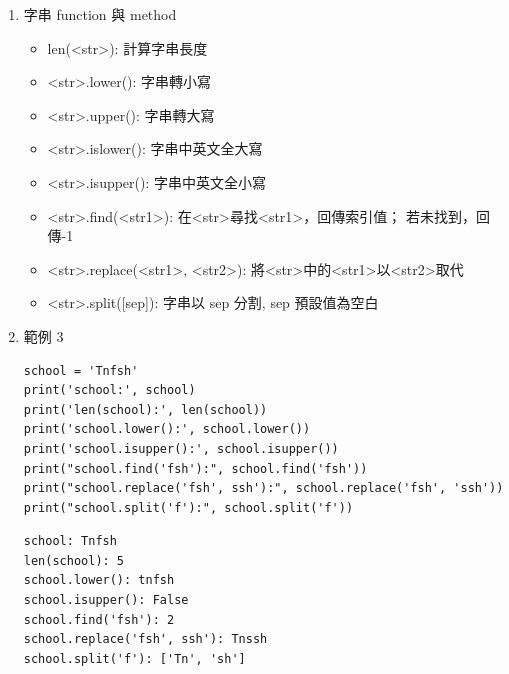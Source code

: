 \documentclass[a4paper,12pt]{article}
\begin{document}
\begin{enumerate}
\begin{verbatim}
tel+ext: 06-2371206#600
ext*2: #600#600
tel[5]: 7
tel[1:4]: 6-2
tel[6: ]: 1206
tel[ :6]: 06-237
tel[::-1]: 6021732-60
'9' in tel: False
\end{verbatim}
\item 字串 function 與 method
\label{sec:orgbfe671f}
\begin{itemize}
\item len(<str>):	計算字串長度\\
\item <str>.lower(): 字串轉小寫\\
\item <str>.upper(): 字串轉大寫\\
\item <str>.islower(): 字串中英文全大寫\\
\item <str>.isupper(): 字串中英文全小寫\\
\item <str>.find(<str1>): 在<str>尋找<str1>，回傳索引值； 若未找到，回傳-1\\
\item <str>.replace(<str1>, <str2>): 將<str>中的<str1>以<str2>取代\\
\item <str>.split([sep]): 字串以 sep 分割, sep 預設值為空白\\
\end{itemize}
\item 範例 3
\label{sec:org77d9b3d}
\lstset{breaklines=true,language=Python,label= ,caption= ,captionpos=b,firstnumber=1,numbers=left}
\begin{lstlisting}
school = 'Tnfsh'
print('school:', school)
print('len(school):', len(school))
print('school.lower():', school.lower())
print('school.isupper():', school.isupper())
print("school.find('fsh'):", school.find('fsh'))
print("school.replace('fsh', ssh'):", school.replace('fsh', 'ssh'))
print("school.split('f'):", school.split('f'))
\end{lstlisting}

\begin{verbatim}
school: Tnfsh
len(school): 5
school.lower(): tnfsh
school.isupper(): False
school.find('fsh'): 2
school.replace('fsh', ssh'): Tnssh
school.split('f'): ['Tn', 'sh']
\end{verbatim}
\end{enumerate}
\end{document}
